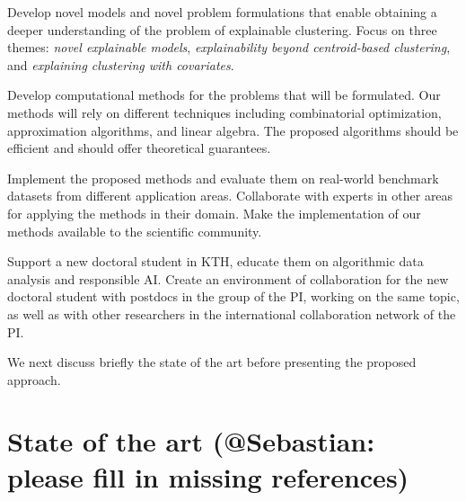 \documentclass[a4paper,11pt]{article}
\begin{document}
\vspace{-2mm}
\begin{description}
\setlength{\itemsep}{-4pt}
\item[{Models and problems:}]
Develop novel models and novel problem formulations that enable 
obtaining a deeper understanding of the problem of explainable clustering.
Focus on three themes: 
\emph{novel explainable models}, 
\emph{explainability beyond centroid-based clustering}, and 
\emph{explaining clustering with covariates}.

\item[{Algorithms:}]
Develop computational methods for the problems that will be formulated.
Our methods will rely on different techniques
including combinatorial optimization, approximation algorithms, and linear algebra.
The proposed algorithms should be efficient and should offer theoretical guarantees.

\item[{Empirical evaluation and outreach:}]
Implement the proposed methods and evaluate them on 
real-world benchmark datasets from different application areas.
Collaborate with experts in other areas for applying the methods in their domain.
Make the implementation of our methods available to the scientific community.

\item[{Education in KTH:}]
Support a new doctoral student in KTH, 
educate them on algorithmic data analysis and responsible AI. 
Create an environment of collaboration for the new doctoral student 
with postdocs in the group of the PI, working on the same topic, 
as well as with other researchers in the international collaboration network of the PI.
\end{description}

\vspace{-2mm}
\noindent
We next discuss briefly the state of the art
before presenting the proposed approach.

\section{State of the art {\color{orange}(@Sebastian: please fill in missing references)}}

\end{document}
